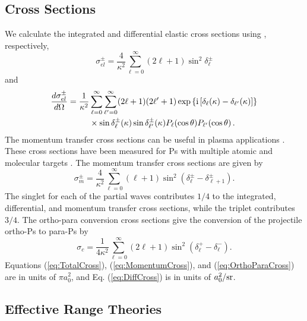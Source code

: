 \documentclass[preprint,showpacs,showkeys,preprintnumbers,amsmath,amssymb,longbibliography,pra,aps]{revtex4-1}
\newcommand{\ii}{{\rm{i}}}
\begin{document}
\subsection{Cross Sections}

We calculate the integrated and differential elastic cross sections using
\cite{Bransden2003}, respectively,
\begin{equation}
\label{eq:TotalCross}
\sigma_{el}^\pm = \frac{4}{\kappa^2} \sum_{\ell=0}^\infty (2\ell+1) \sin^2
   \delta_\ell^\pm
\end{equation}
and
\begin{align}
\label{eq:DiffCross}
\nonumber \frac{d\sigma_{el}^\pm}{d\Omega} = \frac{1}{\kappa^2} & \sum_{\ell=0}
  ^\infty \sum_{\ell^\prime=0}^\infty (2\ell+1)(2\ell^\prime+1) \exp
  \left\{\ii \left[\delta_\ell(\kappa) - \delta_{\ell^\prime}(\kappa) \right]
  \right\} \\
& \times \sin\delta_\ell^\pm(\kappa) \sin\delta_{\ell^\prime}^\pm(\kappa) P_\ell
  (\cos\theta) P_{\ell^\prime}(\cos\theta)\,.
\end{align}
The momentum transfer cross sections can be useful in plasma applications
\cite{Wang2014, McEachran2014}. These cross sections have been measured for Ps
with multiple atomic and molecular targets \cite{Nagashima1998,Saito2003}. The
momentum transfer cross sections are given by \cite{Bransden2003}
\begin{equation}
\label{eq:MomentumCross}
\sigma_{m}^\pm = \frac{4}{\kappa^2} \sum_{\ell=0}^\infty (\ell+1) \sin^2
  (\delta_\ell^\pm - \delta_{\ell+1}^\pm) .
\end{equation}
The singlet for each of the partial waves contributes $1/4$ to the integrated,
differential, and momentum transfer cross sections, while the triplet
contributes $3/4$. The ortho-para conversion cross sections give the conversion
of the projectile ortho-Ps to para-Ps by \cite{Hara1975}
\begin{equation}
\label{eq:OrthoParaCross}
\sigma_{c} = \frac{1}{4 \kappa^2} \sum_{\ell=0}^\infty (2 \ell+1) \sin^2
  (\delta_\ell^+ - \delta_\ell^-).
\end{equation}
Equations (\ref{eq:TotalCross}), (\ref{eq:MomentumCross}), and
(\ref{eq:OrthoParaCross}) are in units of $\pi a_0^2$, and
Eq. (\ref{eq:DiffCross}) is in units of $a_0^2 / \rm{sr}$. 


\subsection{Effective Range Theories}
\end{document}
